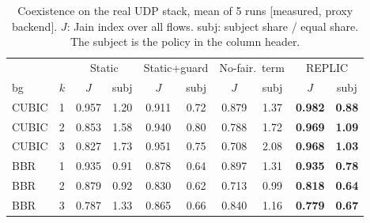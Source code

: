 \begin{table}[t]
\centering\small
\setlength{\tabcolsep}{4pt}
\caption{Coexistence on the real UDP stack, mean of 5 runs [measured, proxy backend]. $J$: Jain index over all flows. subj: subject share / equal share. The subject is the policy in the column header.}
\label{tab:fair}
\begin{tabular}{llcc|cc|cc|cc}
\toprule
 & & \multicolumn{2}{c}{Static} & \multicolumn{2}{c}{Static+guard} & \multicolumn{2}{c}{No-fair.\ term} & \multicolumn{2}{c}{REPLIC} \\
bg & $k$ & $J$ & subj & $J$ & subj & $J$ & subj & $J$ & subj \\
\midrule
CUBIC & 1 & 0.957 & 1.20 & 0.911 & 0.72 & 0.879 & 1.37 & \textbf{0.982} & \textbf{0.88} \\
CUBIC & 2 & 0.853 & 1.58 & 0.940 & 0.80 & 0.788 & 1.72 & \textbf{0.969} & \textbf{1.09} \\
CUBIC & 3 & 0.827 & 1.73 & 0.951 & 0.75 & 0.708 & 2.08 & \textbf{0.968} & \textbf{1.03} \\
\midrule
BBR & 1 & 0.935 & 0.91 & 0.878 & 0.64 & 0.897 & 1.31 & \textbf{0.935} & \textbf{0.78} \\
BBR & 2 & 0.879 & 0.92 & 0.830 & 0.62 & 0.713 & 0.99 & \textbf{0.818} & \textbf{0.64} \\
BBR & 3 & 0.787 & 1.33 & 0.865 & 0.66 & 0.840 & 1.16 & \textbf{0.779} & \textbf{0.67} \\
\bottomrule
\end{tabular}
\end{table}

